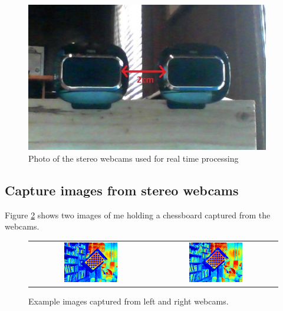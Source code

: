 \documentclass[11pt,fleqn]{article}
\begin{document}
\begin{figure}[!ht]
\centering
\includegraphics[width=0.95\textwidth, trim=30 50 45 50, clip]{images/setup.jpg}
\caption[Photo of the stereo webcams used for real time processing]{Photo of the stereo webcams used for real time processing}
\label{fig:cam}
\end{figure}

\subsection{Capture images from stereo webcams}  

Figure \ref{fig:chess} shows two images of me holding a chessboard captured from the webcams.

\begin{figure}[!h]
\centering
\begin{tabular}{cc}
\includegraphics[width=0.45\textwidth]{images/l16.png} &
\includegraphics[width=0.45\textwidth]{images/r16.png} \\[2pt]
\end{tabular}
\caption[Example images captured from webcams]{Example images captured from left and right webcams.}
\label{fig:chess}
\end{figure}
\end{document}
